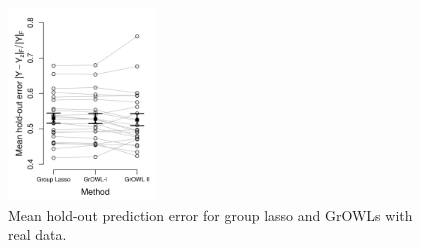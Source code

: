 \begin{figure}[!t]
    \centering
  \includegraphics[width=0.35\textwidth]{figures/Final_Error_Visual.png}
      
    \caption{Mean hold-out prediction error for group lasso and GrOWLs with real data.}
    \label{fig.error}
  \end{figure}



\fi

